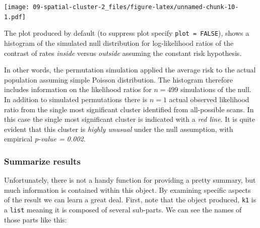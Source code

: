 \documentclass[
]{book}
\newenvironment{Shaded}{\begin{snugshade}}{\end{snugshade}}
\newcommand{\AttributeTok}[1]{\textcolor[rgb]{0.77,0.63,0.00}{#1}}
\newcommand{\DecValTok}[1]{\textcolor[rgb]{0.00,0.00,0.81}{#1}}
\newcommand{\FloatTok}[1]{\textcolor[rgb]{0.00,0.00,0.81}{#1}}
\newcommand{\FunctionTok}[1]{\textcolor[rgb]{0.00,0.00,0.00}{#1}}
\newcommand{\NormalTok}[1]{#1}
\newcommand{\OtherTok}[1]{\textcolor[rgb]{0.56,0.35,0.01}{#1}}
\newcommand{\SpecialCharTok}[1]{\textcolor[rgb]{0.00,0.00,0.00}{#1}}
\begin{document}
\begin{Shaded}
\end{Shaded}

\texttt{[image: 09-spatial-cluster-2\_files/figure-latex/unnamed-chunk-10-1.pdf]}

The plot produced by default (to suppress plot specify \texttt{plot\ =\ FALSE}), shows a histogram of the simulated null distribution for log-likelihood ratios of the contrast of rates \emph{inside} versus \emph{outside} assuming the constant risk hypothesis.

In other words, the permutation simulation applied the average risk to the actual population assuming simple Poisson distribution. The histogram therefore includes information on the likelihood ratios for \(n=499\) simulations of the null. In addition to simulated permutations there is \(n=1\) actual observed likelihood ratio from the single most significant cluster identified from all-possible scans. In this case the single most significant cluster is indicated with a \emph{red line}. It is quite evident that this cluster is \emph{highly unusual} under the null assumption, with empirical \emph{p-value = 0.002}.

\hypertarget{summarize-results}{%
\subsubsection{Summarize results}\label{summarize-results}}

Unfortunately, there is not a handy function for providing a pretty summary, but much information is contained within this object. By examining specific aspects of the result we can learn a great deal. First, note that the object produced, \texttt{k1} is a \texttt{list} meaning it is composed of several sub-parts. We can see the names of those parts like this:
\end{document}
